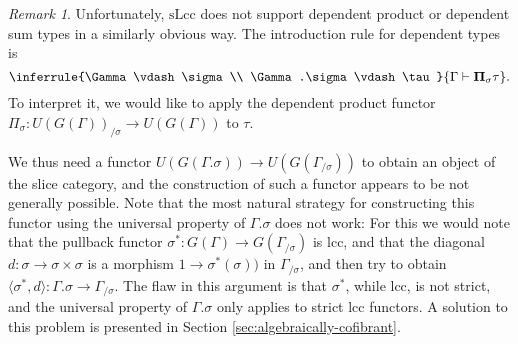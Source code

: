 \documentclass[a4paper]{article}
\theoremstyle{remark}
\newtheorem{remark}[theorem]{Remark}
\theoremstyle{definition}
\begin{document}
\begin{remark}
  \label{rem:slcc-slice-problem}
  Unfortunately, $\mathrm{sLcc}$ does not support dependent product or dependent sum types in a similarly obvious way.
  The introduction rule for dependent types is
  \begin{equation}
    \inferrule
    {\Gamma \vdash \sigma \\ \Gamma.\sigma \vdash \tau}
    {\Gamma \vdash \mathbf{\Pi}_\sigma \tau}.
  \end{equation}
  To interpret it, we would like to apply the dependent product functor $\Pi_\sigma : U(G(\Gamma))_{/ \sigma} \rightarrow U(G(\Gamma))$ to $\tau$.
  
  We thus need a functor $U(G(\Gamma.\sigma)) \rightarrow U(G(\Gamma_{/ \sigma}))$ to obtain an object of the slice category, and the construction of such a functor appears to be not generally possible.
  Note that the most natural strategy for constructing this functor using the universal property of $\Gamma.\sigma$ does not work:
  For this we would note that the pullback functor $\sigma^* : G(\Gamma) \rightarrow G(\Gamma_{/ \sigma})$ is lcc, and that the diagonal $d : \sigma \rightarrow \sigma \times \sigma$ is a morphism $1 \rightarrow \sigma^*(\sigma))$ in $\Gamma_{/ \sigma}$, and then try to obtain $\langle \sigma^*, d \rangle : \Gamma.\sigma \rightarrow \Gamma_{/ \sigma}$.
  The flaw in this argument is that $\sigma^*$, while lcc, is not strict, and the universal property of $\Gamma.\sigma$ only applies to strict lcc functors.
  A solution to this problem is presented in Section \ref{sec:algebraically-cofibrant}.
\end{remark}
\end{document}
